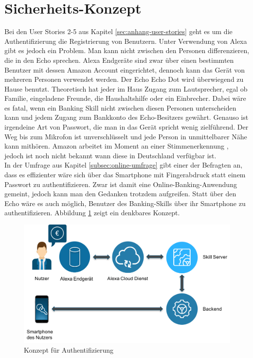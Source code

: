 \section{Sicherheits-Konzept}
\label{sec:sicherheits-konzept}
Bei den User Stories 2-5 aus Kapitel \ref{sec:anhang-user-stories} geht es um die Authentifizierung \bzw die Registrierung von Benutzern. Unter Verwendung von Alexa gibt es jedoch ein Problem. Man kann nicht zwischen den Personen differenzieren, die in den Echo sprechen. Alexa Endgeräte sind zwar über einen bestimmten Benutzer mit dessen Amazon Account eingerichtet, dennoch kann das Gerät von mehreren Personen verwendet werden. Der Echo \bzw Echo Dot wird überwiegend zu Hause benutzt. Theoretisch hat jeder im Haus Zugang zum Lautsprecher, egal ob Familie, eingeladene Freunde, die Haushaltshilfe oder ein Einbrecher. Dabei wäre es fatal, wenn ein Banking Skill nicht zwischen diesen Personen unterscheiden kann und jedem Zugang zum Bankkonto des Echo-Besitzers gewährt. Genauso ist irgendeine Art von Passwort, die man in das Gerät spricht wenig zielführend. Der Weg bis zum Mikrofon ist unverschlüsselt und jede Person in unmittelbarer Nähe kann mithören. Amazon arbeitet im Moment an einer Stimmenerkennung \cite{alexa-voice-recognition}, jedoch ist noch nicht bekannt wann diese in Deutschland verfügbar ist.\\
In der Umfrage aus Kapitel \ref{subsec:online-umfrage} gibt einer der Befragten an, dass es effizienter wäre sich über das Smartphone mit Fingerabdruck statt einem Passwort zu authentifizieren. Zwar ist damit eine Online-Banking-Anwendung gemeint, jedoch kann man den Gedanken trotzdem aufgreifen. Statt über den Echo wäre es auch möglich, Benutzer des Banking-Skills über ihr Smartphone zu authentifizieren. Abbildung \ref{fig:security-concept} zeigt ein denkbares Konzept.

\begin{figure}[!htb]
    \centering
    \includegraphics[width=1.0\textwidth]{bilder/3_securityConcept.png}
    \caption{Konzept für Authentifizierung}
    \label{fig:security-concept}
\end{figure}

